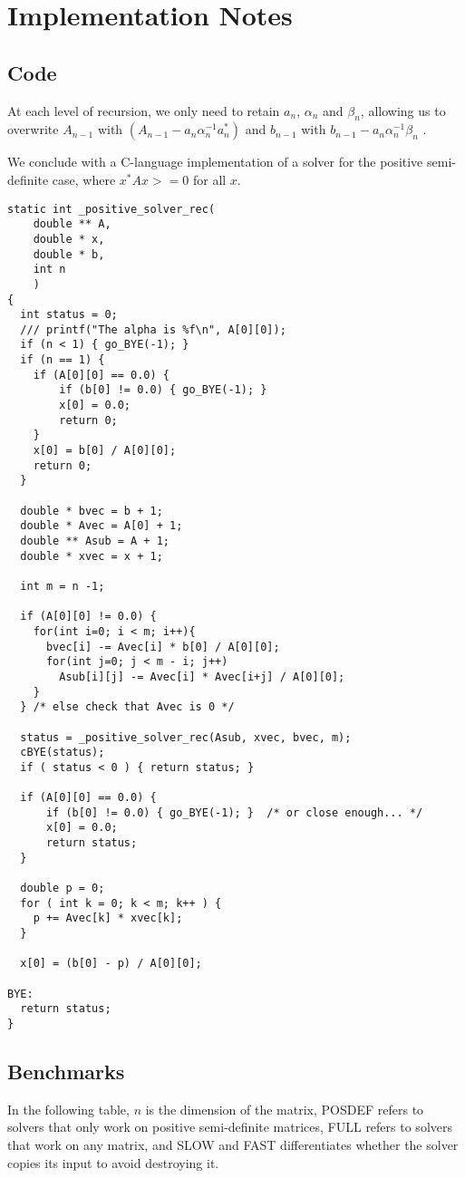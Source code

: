 \documentclass{article}
\begin{document}
\section{Implementation Notes}
\subsection{Code}
At each level of recursion, we only need to retain
$a_n$,
$\alpha_n$
and
$\beta_n$, allowing us to overwrite
$A_{n-1}$
with $(A_{n-1} - a_n\alpha_n^{-1}a_n^*)$
and
$b_{n-1}$ with
$b_{n-1}-a_n\alpha_n^{-1}\beta_n$
.

We conclude with a C-language implementation of a solver for the positive semi-definite case, where
$x^*Ax >=0 $ for all $x$.

\begin{verbatim}
static int _positive_solver_rec(
    double ** A,
    double * x,
    double * b,
    int n
    )
{
  int status = 0;
  /// printf("The alpha is %f\n", A[0][0]);
  if (n < 1) { go_BYE(-1); }
  if (n == 1) {
    if (A[0][0] == 0.0) {
        if (b[0] != 0.0) { go_BYE(-1); }
        x[0] = 0.0;
        return 0;
    }
    x[0] = b[0] / A[0][0];
    return 0;
  }

  double * bvec = b + 1;
  double * Avec = A[0] + 1;
  double ** Asub = A + 1;
  double * xvec = x + 1;

  int m = n -1;

  if (A[0][0] != 0.0) {
    for(int i=0; i < m; i++){
      bvec[i] -= Avec[i] * b[0] / A[0][0];
      for(int j=0; j < m - i; j++)
        Asub[i][j] -= Avec[i] * Avec[i+j] / A[0][0];
    }
  } /* else check that Avec is 0 */

  status = _positive_solver_rec(Asub, xvec, bvec, m);
  cBYE(status);
  if ( status < 0 ) { return status; }

  if (A[0][0] == 0.0) {
      if (b[0] != 0.0) { go_BYE(-1); }  /* or close enough... */
      x[0] = 0.0;
      return status;
  }

  double p = 0;
  for ( int k = 0; k < m; k++ ) {
    p += Avec[k] * xvec[k];
  }

  x[0] = (b[0] - p) / A[0][0];

BYE:
  return status;
}
\end{verbatim}

\subsection{Benchmarks}

In the following table, $n$ is the dimension of the matrix,
POSDEF refers to solvers that only work on positive
semi-definite matrices, FULL refers to solvers that work on any matrix, and SLOW
and FAST differentiates whether the solver copies its input to avoid destroying
it.
\end{document}
